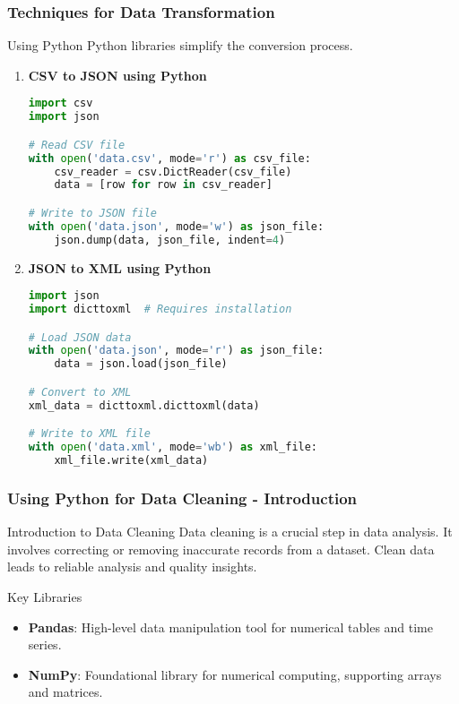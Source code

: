 \documentclass[aspectratio=169]{beamer}
\begin{document}
\begin{frame}[fragile]
    \frametitle{Techniques for Data Transformation}
    \begin{block}{Using Python}
        Python libraries simplify the conversion process.
    \end{block}
    \begin{enumerate}
        \item \textbf{CSV to JSON using Python}
        \begin{lstlisting}[language=Python]
import csv
import json

# Read CSV file
with open('data.csv', mode='r') as csv_file:
    csv_reader = csv.DictReader(csv_file)
    data = [row for row in csv_reader]

# Write to JSON file
with open('data.json', mode='w') as json_file:
    json.dump(data, json_file, indent=4)
        \end{lstlisting}
        
        \item \textbf{JSON to XML using Python}
        \begin{lstlisting}[language=Python]
import json
import dicttoxml  # Requires installation

# Load JSON data
with open('data.json', mode='r') as json_file:
    data = json.load(json_file)

# Convert to XML
xml_data = dicttoxml.dicttoxml(data)

# Write to XML file
with open('data.xml', mode='wb') as xml_file:
    xml_file.write(xml_data)
        \end{lstlisting}
    \end{enumerate}
\end{frame}

\begin{frame}[fragile]
    \frametitle{Using Python for Data Cleaning - Introduction}
    \begin{block}{Introduction to Data Cleaning}
        Data cleaning is a crucial step in data analysis. It involves correcting or removing inaccurate records from a dataset. Clean data leads to reliable analysis and quality insights.
    \end{block}
    \begin{block}{Key Libraries}
        \begin{itemize}
            \item \textbf{Pandas}: High-level data manipulation tool for numerical tables and time series.
            \item \textbf{NumPy}: Foundational library for numerical computing, supporting arrays and matrices.
        \end{itemize}
    \end{block}
\end{frame}
\end{document}
